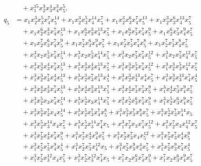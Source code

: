 \documentclass[reqno]{amsart}
\theoremstyle{plain}
\theoremstyle{definition}
\theoremstyle{plain}
\theoremstyle{definition}
\numberwithin{equation}{section}
\begin{document}
\begin{align*}
&\quad + x_1^{15}x_2^{3}x_3^{4}x_4^{3}x_5^{5},\\
q_5 &= x_1x_2^{3}x_3^{5}x_4^{7}x_5^{14} + x_1x_2^{3}x_3^{5}x_4^{14}x_5^{7} + x_1x_2^{3}x_3^{6}x_4^{7}x_5^{13} + x_1x_2^{3}x_3^{6}x_4^{13}x_5^{7}\\ 
&\quad + x_1x_2^{6}x_3^{3}x_4^{7}x_5^{13} + x_1x_2^{6}x_3^{3}x_4^{13}x_5^{7} + x_1x_2^{6}x_3^{7}x_4^{7}x_5^{9} + x_1x_2^{6}x_3^{7}x_4^{9}x_5^{7}\\ 
&\quad + x_1x_2^{7}x_3^{6}x_4^{7}x_5^{9} + x_1x_2^{7}x_3^{6}x_4^{9}x_5^{7} + x_1x_2^{7}x_3^{7}x_4^{7}x_5^{8} + x_1x_2^{7}x_3^{7}x_4^{8}x_5^{7}\\ 
&\quad + x_1^{3}x_2x_3^{5}x_4^{7}x_5^{14} + x_1^{3}x_2x_3^{5}x_4^{14}x_5^{7} + x_1^{3}x_2x_3^{7}x_4^{7}x_5^{12} + x_1^{3}x_2x_3^{7}x_4^{12}x_5^{7}\\ 
&\quad + x_1^{3}x_2^{3}x_3^{4}x_4^{7}x_5^{13} + x_1^{3}x_2^{3}x_3^{4}x_4^{13}x_5^{7} + x_1^{3}x_2^{3}x_3^{5}x_4^{7}x_5^{12} + x_1^{3}x_2^{3}x_3^{5}x_4^{12}x_5^{7}\\ 
&\quad + x_1^{3}x_2^{3}x_3^{7}x_4^{4}x_5^{13} + x_1^{3}x_2^{3}x_3^{7}x_4^{13}x_5^{4} + x_1^{3}x_2^{3}x_3^{13}x_4^{4}x_5^{7} + x_1^{3}x_2^{3}x_3^{13}x_4^{7}x_5^{4}\\ 
&\quad + x_1^{3}x_2^{4}x_3^{3}x_4^{7}x_5^{13} + x_1^{3}x_2^{4}x_3^{3}x_4^{13}x_5^{7} + x_1^{3}x_2^{4}x_3^{7}x_4^{7}x_5^{9} + x_1^{3}x_2^{4}x_3^{7}x_4^{9}x_5^{7}\\ 
&\quad + x_1^{3}x_2^{5}x_3x_4^{7}x_5^{14} + x_1^{3}x_2^{5}x_3x_4^{14}x_5^{7} + x_1^{3}x_2^{5}x_3^{6}x_4^{7}x_5^{9} + x_1^{3}x_2^{5}x_3^{6}x_4^{9}x_5^{7}\\ 
&\quad + x_1^{3}x_2^{5}x_3^{7}x_4x_5^{14} + x_1^{3}x_2^{5}x_3^{7}x_4^{7}x_5^{8} + x_1^{3}x_2^{5}x_3^{7}x_4^{8}x_5^{7} + x_1^{3}x_2^{5}x_3^{7}x_4^{14}x_5\\ 
&\quad + x_1^{3}x_2^{5}x_3^{14}x_4x_5^{7} + x_1^{3}x_2^{5}x_3^{14}x_4^{7}x_5 + x_1^{3}x_2^{7}x_3x_4^{7}x_5^{12} + x_1^{3}x_2^{7}x_3x_4^{12}x_5^{7}\\ 
&\quad + x_1^{3}x_2^{7}x_3^{4}x_4^{7}x_5^{9} + x_1^{3}x_2^{7}x_3^{4}x_4^{9}x_5^{7} + x_1^{3}x_2^{7}x_3^{7}x_4x_5^{12} + x_1^{3}x_2^{7}x_3^{7}x_4^{4}x_5^{9}\\ 
&\quad + x_1^{3}x_2^{7}x_3^{7}x_4^{9}x_5^{4} + x_1^{3}x_2^{7}x_3^{7}x_4^{12}x_5 + x_1^{3}x_2^{7}x_3^{9}x_4^{4}x_5^{7} + x_1^{3}x_2^{7}x_3^{9}x_4^{7}x_5^{4}\\ 
&\quad + x_1^{3}x_2^{7}x_3^{12}x_4x_5^{7} + x_1^{3}x_2^{7}x_3^{12}x_4^{7}x_5 + x_1^{7}x_2x_3^{6}x_4^{7}x_5^{9} + x_1^{7}x_2x_3^{6}x_4^{9}x_5^{7}\\ 

\end{align*}
\end{document}
